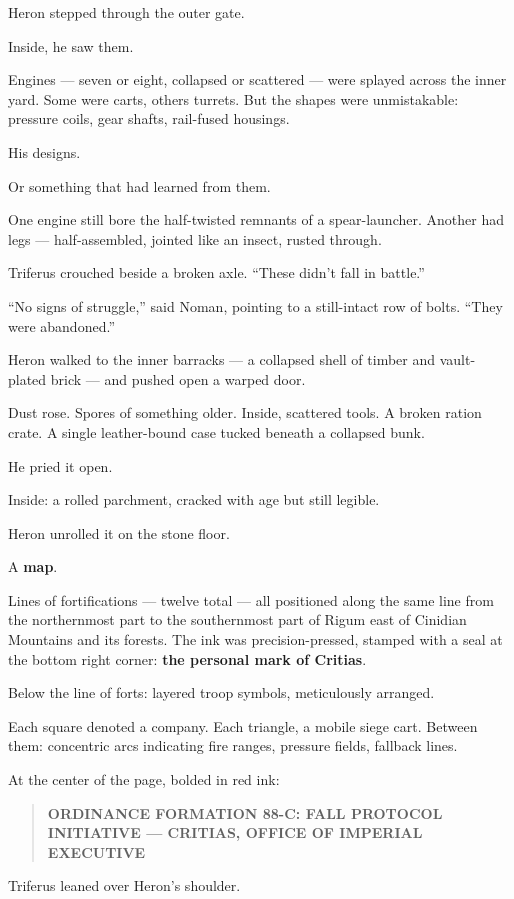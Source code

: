 \documentclass[12pt]{article}
\begin{document}
Heron stepped through the outer gate.

Inside, he saw them.

Engines — seven or eight, collapsed or scattered — were splayed across the inner yard. Some were carts, others turrets. But the shapes were unmistakable: pressure coils, gear shafts, rail-fused housings.

His designs.

Or something that had learned from them.

One engine still bore the half-twisted remnants of a spear-launcher. Another had legs — half-assembled, jointed like an insect, rusted through.

Triferus crouched beside a broken axle. “These didn’t fall in battle.”

“No signs of struggle,” said Noman, pointing to a still-intact row of bolts. “They were abandoned.”

Heron walked to the inner barracks — a collapsed shell of timber and vault-plated brick — and pushed open a warped door.

Dust rose. Spores of something older. Inside, scattered tools. A broken ration crate. A single leather-bound case tucked beneath a collapsed bunk.

He pried it open.

Inside: a rolled parchment, cracked with age but still legible.

Heron unrolled it on the stone floor.

A \textbf{map}.

Lines of fortifications — twelve total — all positioned along the same line from the northernmost part to the southernmost part of Rigum east of Cinidian Mountains and its forests. The ink was precision-pressed, stamped with a seal at the bottom right corner: \textbf{the personal mark of Critias}.

Below the line of forts: layered troop symbols, meticulously arranged.

Each square denoted a company. Each triangle, a mobile siege cart. Between them: concentric arcs indicating fire ranges, pressure fields, fallback lines.

At the center of the page, bolded in red ink:

\begin{quote}
\textbf{ORDINANCE FORMATION 88-C: FALL PROTOCOL INITIATIVE — CRITIAS, OFFICE OF IMPERIAL EXECUTIVE}
\end{quote}

Triferus leaned over Heron’s shoulder.
\end{document}
